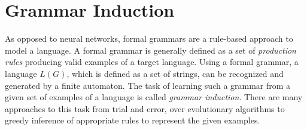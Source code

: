%
%
%
%

\section{Grammar Induction}

As opposed to neural networks, formal grammars are a rule-based approach to model a language. A formal grammar is generally defined as a set of \emph{production rules} producing valid examples of a target language.
\noindent
Using a formal grammar, a language $L(G)$, which is defined as a set of strings, can be recognized and generated by a finite automaton. The task of learning such a grammar from a given set of examples of a language is called \emph{grammar induction}. There are many approaches to this task from trial and error, over evolutionary algorithms to greedy inference of appropriate rules to represent the given examples.


